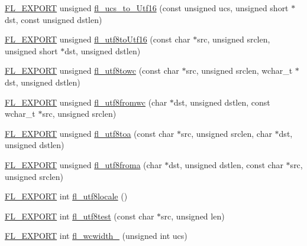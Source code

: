 \begin{DoxyCompactItemize}
\item 
\hyperlink{_fl___export_8_h_aa9ba29a18aee9d738370a06eeb4470fc}{F\+L\+\_\+\+E\+X\+P\+O\+RT} unsigned \hyperlink{group__fl__unicode_gae1bb53a16c45a718456955b43c98f919}{fl\+\_\+ucs\+\_\+to\+\_\+\+Utf16} (const unsigned ucs, unsigned short $\ast$dst, const unsigned dstlen)
\item 
\hyperlink{_fl___export_8_h_aa9ba29a18aee9d738370a06eeb4470fc}{F\+L\+\_\+\+E\+X\+P\+O\+RT} unsigned \hyperlink{group__fl__unicode_gab396e39d844d3be548ca6cf285669a94}{fl\+\_\+utf8to\+Utf16} (const char $\ast$src, unsigned srclen, unsigned short $\ast$dst, unsigned dstlen)
\item 
\hyperlink{_fl___export_8_h_aa9ba29a18aee9d738370a06eeb4470fc}{F\+L\+\_\+\+E\+X\+P\+O\+RT} unsigned \hyperlink{group__fl__unicode_ga0f85a780de2aedbe38e27bf5d6fc53f1}{fl\+\_\+utf8towc} (const char $\ast$src, unsigned srclen, wchar\+\_\+t $\ast$dst, unsigned dstlen)
\item 
\hyperlink{_fl___export_8_h_aa9ba29a18aee9d738370a06eeb4470fc}{F\+L\+\_\+\+E\+X\+P\+O\+RT} unsigned \hyperlink{group__fl__unicode_ga3d364793a3f0c22185a6fa976695fde6}{fl\+\_\+utf8fromwc} (char $\ast$dst, unsigned dstlen, const wchar\+\_\+t $\ast$src, unsigned srclen)
\item 
\hyperlink{_fl___export_8_h_aa9ba29a18aee9d738370a06eeb4470fc}{F\+L\+\_\+\+E\+X\+P\+O\+RT} unsigned \hyperlink{group__fl__unicode_gad22f383326e9614fd3d882fd61d51376}{fl\+\_\+utf8toa} (const char $\ast$src, unsigned srclen, char $\ast$dst, unsigned dstlen)
\item 
\hyperlink{_fl___export_8_h_aa9ba29a18aee9d738370a06eeb4470fc}{F\+L\+\_\+\+E\+X\+P\+O\+RT} unsigned \hyperlink{group__fl__unicode_gac820099e18f6805c9798f4b8f1d94058}{fl\+\_\+utf8froma} (char $\ast$dst, unsigned dstlen, const char $\ast$src, unsigned srclen)
\item 
\hyperlink{_fl___export_8_h_aa9ba29a18aee9d738370a06eeb4470fc}{F\+L\+\_\+\+E\+X\+P\+O\+RT} int \hyperlink{group__fl__unicode_ga086d497c18594b97df69da86815a4000}{fl\+\_\+utf8locale} ()
\item 
\hyperlink{_fl___export_8_h_aa9ba29a18aee9d738370a06eeb4470fc}{F\+L\+\_\+\+E\+X\+P\+O\+RT} int \hyperlink{group__fl__unicode_ga59e041afb75f3f3084a7841a8fdd8edd}{fl\+\_\+utf8test} (const char $\ast$src, unsigned len)
\item 
\hyperlink{_fl___export_8_h_aa9ba29a18aee9d738370a06eeb4470fc}{F\+L\+\_\+\+E\+X\+P\+O\+RT} int \hyperlink{group__fl__unicode_gaf13529fec4fe9e08dbe36d03869fb805}{fl\+\_\+wcwidth\+\_\+} (unsigned int ucs)

\end{DoxyCompactItemize}
